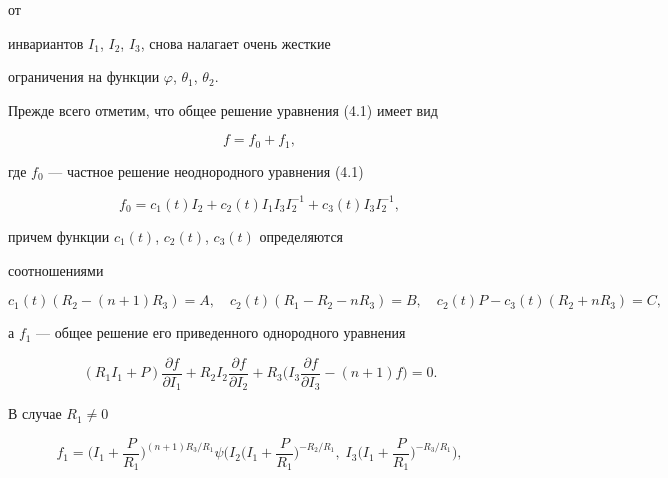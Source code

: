 от


инвариантов $I_1$, $I_2$, $I_3$, снова налагает очень жесткие


ограничения на функции $\varphi$, $\theta_1$, $\theta_2$.





Прежде всего отметим, что общее решение уравнения (4.1) имеет вид


\begin{equation}


f=f_0+f_1,\tag{4.3}


\end{equation}


где $f_0$ --- частное решение неоднородного уравнения (4.1)


\begin{equation}


f_0=c_1(t)I_2+c_2(t)I_1I_3I^{-1}_2+c_3(t)I_3I^{-1}_2,\tag{4.4}


\end{equation}


причем функции $c_1(t)$, $c_2(t)$, $c_3(t)$ определяются


соотношениями


\begin{equation}


c_1(t)(R_2-(n+1)R_3)=A,\quad c_2(t)(R_1-R_2-nR_3)=B,\quad


c_2(t)P-c_3(t)(R_2+nR_3)=C,\tag{4.5}


\end{equation}


а $f_1$ --- общее решение его приведенного однородного уравнения


$$


(R_1I_1+P)\frac{\partial f}{\partial I_1}+R_2I_2


\frac{\partial f}{\partial I_2}+R_3\biggr(I_3


\frac{\partial f}{\partial I_3}-(n+1)f\biggr)=0.


$$


В случае $R_1\ne 0$


\begin{equation}


f_1=\biggl(I_1+\frac{P}{R_1}\biggr)^{(n+1)R_3/R_1}


\psi\biggl(I_2\biggl(I_1+\frac{P}{R_1}\biggr)^{-R_2/R_1},\;


I_3\biggl(I_1+\frac{P}{R_1}\biggr)^{-R_3/R_1}\biggr),\tag{4.6}


\end{equation}


